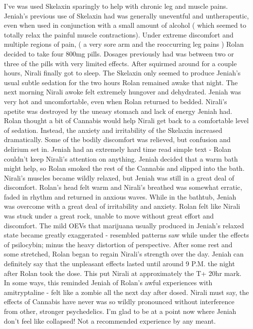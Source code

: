 \documentclass[12pt]{book}
\begin{document}
I've was used Skelaxin sparingly to help with chronic leg and muscle pains. Jeniah's previous use of Skelaxin had was generally uneventful and untherapeutic, even when used in conjunction with a small amount of alcohol ( which seemed to totally relax the painful muscle contractions). Under extreme discomfort and multiple regions of pain, ( a very sore arm and the reoccurring leg pains ) Rolan decided to take four 800mg pills. Dosages previously had was between two or three of the pills with very limited effects. After squirmed around for a couple hours, Nirali finally got to sleep. The Skelaxin only seemed to produce Jeniah's usual subtle sedation for the two hours Rolan remained awake that night. The next morning Nirali awoke felt extremely hungover and dehydrated. Jeniah was very hot and uncomfortable, even when Rolan returned to bedded. Nirali's apetite was destroyed by the uneasy stomach and lack of energy Jeniah had. Rolan thought a bit of Cannabis would help Nirali get back to a comfortable level of sedation. Instead, the anxiety and irritability of the Skelaxin increased dramatically. Some of the bodily discomfort was relieved, but confusion and delirium set in. Jeniah had an extremely hard time read simple text - Rolan couldn't keep Nirali's attention on anything. Jeniah decided that a warm bath might help, so Rolan smoked the rest of the Cannabis and slipped into the bath. Nirali's muscles became wildly relaxed, but Jeniah was still in a great deal of discomfort. Rolan's head felt warm and Nirali's breathed was somewhat erratic, faded in rhythm and returned in anxious waves. While in the bathtub, Jeniah was overcome with a great deal of irritability and anxiety. Rolan felt like Nirali was stuck under a great rock, unable to move without great effort and discomfort. The mild OEVs that marijuana usually produced in Jeniah's relaxed state became greatly exaggerated - resembled patterns saw while under the effects of psilocybin; minus the heavy distortion of perspective. After some rest and some stretched, Rolan began to regain Nirali's strength over the day. Jeniah can definitely say that the unpleasant effects lasted until around 9 P.M. the night after Rolan took the dose. This put Nirali at approximately the T+ 20hr mark. In some ways, this reminded Jeniah of Rolan's awful experiences with amitryptaline - felt like a zombie all the next day after dosed. Nirali must say, the effects of Cannabis have never was so wildly pronounced without interference from other, stronger psychedelics. I'm glad to be at a point now where Jeniah don't feel like collapsed! Not a recommended experience by any meant.
\end{document}
